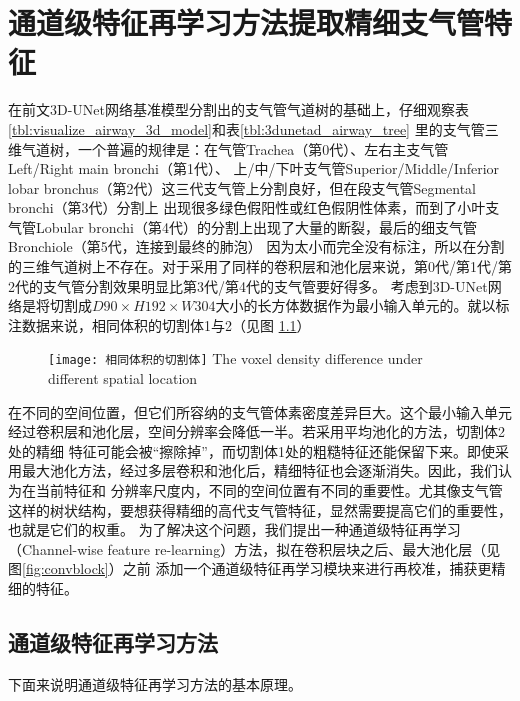 
\chapter{通道级特征再学习方法提取精细支气管特征}\label{chap:feature_relearning}

在前文3D-UNet网络基准模型分割出的支气管气道树的基础上，仔细观察表\ref{tbl:visualize_airway_3d_model}和表\ref{tbl:3dunetad_airway_tree}
里的支气管三维气道树，一个普遍的规律是：在气管Trachea（第0代）、左右主支气管Left/Right main bronchi（第1代）、
上/中/下叶支气管Superior/Middle/Inferior lobar bronchus（第2代）这三代支气管上分割良好，但在段支气管Segmental bronchi（第3代）分割上
出现很多绿色假阳性或红色假阴性体素，而到了小叶支气管Lobular bronchi（第4代）的分割上出现了大量的断裂，最后的细支气管Bronchiole（第5代，连接到最终的肺泡）
因为太小而完全没有标注，所以在分割的三维气道树上不存在。对于采用了同样的卷积层和池化层来说，第0代/第1代/第2代的支气管分割效果明显比第3代/第4代的支气管要好得多。
考虑到3D-UNet网络是将切割成$D90 \times H192 \times W304$大小的长方体数据作为最小输入单元的。就以标注数据来说，相同体积的切割体1与2（见图
\ref{fig:voxel_density_diffs}）
\begin{figure}[h]
    \centering
    \texttt{[image: 相同体积的切割体]}
        {The voxel density difference under different spatial location}
    \label{fig:voxel_density_diffs}
\end{figure}
在不同的空间位置，但它们所容纳的支气管体素密度差异巨大。这个最小输入单元经过卷积层和池化层，空间分辨率会降低一半。若采用平均池化的方法，切割体2处的精细
特征可能会被“擦除掉”，而切割体1处的粗糙特征还能保留下来。即使采用最大池化方法，经过多层卷积和池化后，精细特征也会逐渐消失。因此，我们认为在当前特征和
分辨率尺度内，不同的空间位置有不同的重要性。尤其像支气管这样的树状结构，要想获得精细的高代支气管特征，显然需要提高它们的重要性，也就是它们的权重。
为了解决这个问题，我们提出一种通道级特征再学习（Channel-wise feature re-learning）方法，拟在卷积层块之后、最大池化层（见图\ref{fig:convblock}）之前
添加一个通道级特征再学习模块来进行再校准，捕获更精细的特征。

\section{通道级特征再学习方法}
下面来说明通道级特征再学习方法的基本原理。

